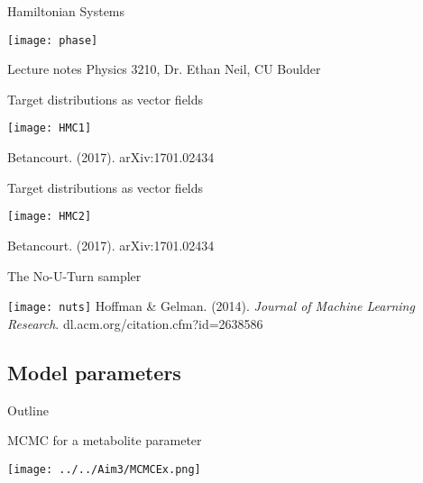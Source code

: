 \documentclass[xcolor=dvipsnames]{beamer}
\begin{document}
\begin{frame}{Hamiltonian Systems}
\vspace{-5pt}
\begin{center}
\texttt{[image: phase]}

Lecture notes Physics 3210, Dr. Ethan Neil, CU Boulder
\end{center}
\end{frame}

\begin{frame}{Target distributions as vector fields}
\vspace{-5pt}
\begin{center}
\texttt{[image: HMC1]}

Betancourt. (2017). arXiv:1701.02434
\end{center}
\end{frame}

\begin{frame}{Target distributions as vector fields}
\vspace{-5pt}
\begin{center}
\texttt{[image: HMC2]}

Betancourt. (2017). arXiv:1701.02434
\end{center}
\end{frame}

\begin{frame}{The No-U-Turn sampler}
\vspace{-10pt}
\begin{center}
\texttt{[image: nuts]}
\vspace{2ex}
Hoffman \& Gelman. (2014). \emph{Journal of Machine Learning Research}. dl.acm.org/citation.cfm?id=2638586
\end{center}
\end{frame}

\subsection{Model parameters}
\begin{frame}{Outline}
\vspace{-10.5pt}
\tableofcontents[currentsection,subsectionstyle=show/shaded/hide]
\end{frame}

\begin{frame}{MCMC for a metabolite parameter}
\vspace{-5pt}
\begin{center}
\texttt{[image: ../../Aim3/MCMCEx.png]}
\end{center}
\end{frame}
\end{document}
